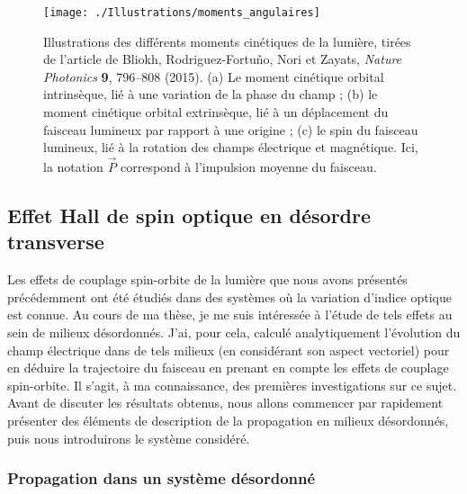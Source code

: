 \documentclass[a4paper,11pt]{article} %
\begin{document}
	\begin{figure}[h]
		\centering
		\begin{minipage}[c]{0.9\linewidth}
			\centering
			\texttt{[image: ./Illustrations/moments\_angulaires]}
			\caption{Illustrations des différents moments cinétiques de la lumière, tirées de l'article de Bliokh, Rodriguez-Fortuño, Nori et Zayats, \textit{Nature Photonics} \textbf{9}, 796--808 (2015). (a) Le moment cinétique orbital intrinsèque, lié à une variation de la phase du champ ; (b) le moment cinétique orbital extrinsèque, lié à un déplacement du faisceau lumineux par rapport à une origine ; (c) le spin du faisceau lumineux, lié à la rotation des champs électrique et magnétique. Ici, la notation $ \vec{P} $ correspond à l'impulsion moyenne du faisceau.}
			\label{fig:moments_angulaires}
		\end{minipage}
	\end{figure}
	
	\subsection{Effet Hall de spin optique en désordre transverse}
	Les effets de couplage spin-orbite de la lumière que nous avons présentés précédemment ont été étudiés dans des systèmes où la variation d'indice optique est connue. Au cours de ma thèse, je me suis intéressée à l'étude de tels effets au sein de milieux désordonnés. J'ai, pour cela, calculé analytiquement l'évolution du champ électrique dans de tels milieux (en considérant son aspect vectoriel) pour en déduire la trajectoire du faisceau en prenant en compte les effets de couplage spin-orbite. Il s'agit, à ma connaissance, des premières investigations sur ce sujet.\\
	Avant de discuter les résultats obtenus, nous allons commencer par rapidement présenter des éléments de description de la propagation en milieux désordonnés, puis nous introduirons le système considéré.
	
	\subsubsection{Propagation dans un système désordonné}
	
\end{document}
